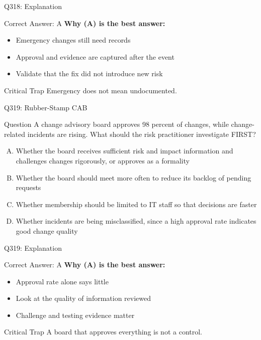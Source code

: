 \documentclass{beamer}
\begin{document}
	\begin{frame}{Q318: Explanation}
		\begin{block}{Correct Answer: A}
			\textbf{Why (A) is the best answer:}
			\begin{itemize}
				\item Emergency changes still need records
				\item Approval and evidence are captured after the event
				\item Validate that the fix did not introduce new risk
			\end{itemize}
		\end{block}
		\begin{alertblock}{Critical Trap}
			Emergency does not mean undocumented.
		\end{alertblock}
	\end{frame}
	
	\begin{frame}{Q319: Rubber-Stamp CAB}
		\begin{block}{Question}
			\small A change advisory board approves 98 percent of changes, while change-related incidents are rising. What should the risk practitioner investigate FIRST?
		\end{block}
		\begin{enumerate}[(A)]
			\footnotesize
			\item Whether the board receives sufficient risk and impact information and challenges changes rigorously, or approves as a formality
			\item Whether the board should meet more often to reduce its backlog of pending requests
			\item Whether membership should be limited to IT staff so that decisions are faster
			\item Whether incidents are being misclassified, since a high approval rate indicates good change quality
		\end{enumerate}
	\end{frame}
	
	\begin{frame}{Q319: Explanation}
		\begin{block}{Correct Answer: A}
			\textbf{Why (A) is the best answer:}
			\begin{itemize}
				\item Approval rate alone says little
				\item Look at the quality of information reviewed
				\item Challenge and testing evidence matter
			\end{itemize}
		\end{block}
		\begin{alertblock}{Critical Trap}
			A board that approves everything is not a control.
		\end{alertblock}
	\end{frame}
	
\end{document}
